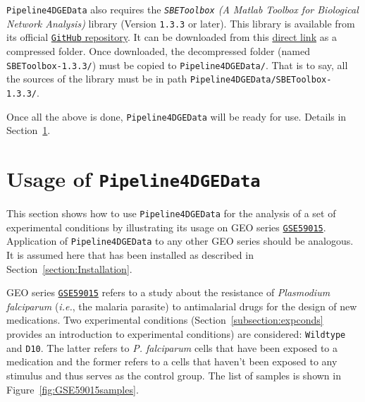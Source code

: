 \documentclass[final,letterpaper,12pt]{article}
\begin{document}
\par \texttt{Pipeline4DGEData} also requires the \textit{\texttt{SBEToolbox} (A Matlab Toolbox for Biological Network Analysis)} library \citep{konganti2013sbetoolbox} (Version \texttt{1.3.3} or later). This library is available from its official \href{https://github.com/biocoder/SBEToolbox/releases}{\texttt{GitHub} repository}. It can be downloaded from this \href{https://github.com/biocoder/SBEToolbox/archive/v1.3.3.zip}{direct link} as a compressed folder. Once downloaded, the decompressed folder (named \texttt{SBEToolbox-1.3.3/}) must be copied to \texttt{Pipeline4DGEData/}. That is to say, all the sources of the library must be in path \texttt{Pipeline4DGEData/SBEToolbox-1.3.3/}.

\par Once all the above is done, \texttt{Pipeline4DGEData} will be ready for use. Details in Section~\ref{section:daExample}.

\section{Usage of \texttt{Pipeline4DGEData}}
\label{section:daExample}

\par This section shows how to use \texttt{Pipeline4DGEData} for the analysis of a set of experimental conditions by illustrating its usage on GEO series \href{https://www.ncbi.nlm.nih.gov/geo/query/acc.cgi?acc=GSE59015}{\texttt{GSE59015}}. Application of \texttt{Pipeline4DGEData} to any other GEO series should be analogous. It is assumed here that has been installed as described in Section~\ref{section:Installation}.

\par GEO series \href{https://www.ncbi.nlm.nih.gov/geo/query/acc.cgi?acc=GSE59015}{\texttt{GSE59015}} refers to a study about the resistance of \textit{Plasmodium falciparum} (\textit{i.e.}, the malaria parasite) to antimalarial drugs for the design of new medications. Two experimental conditions (Section~\ref{subsection:expconds} provides an introduction to experimental conditions) are considered: \texttt{Wildtype} and \texttt{D10}. The latter refers to \textit{P. falciparum} cells that have been exposed to a medication and the former refers to a cells that haven't been exposed to any stimulus and thus serves as the control group. The list of samples is shown in Figure~\ref{fig:GSE59015samples}.
\end{document}
